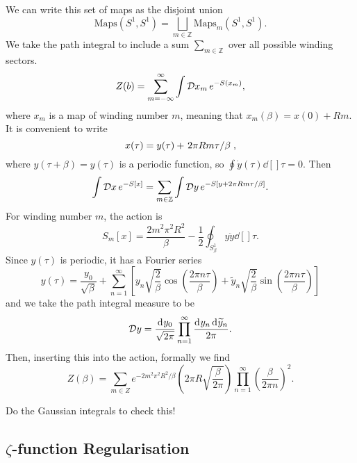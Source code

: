 We can write this set of maps as the disjoint union
\begin{equation}
  \text{Maps}(S^1, S^1) = \bigsqcup_{m \in \mathbb{Z}} \text{Maps}_m (S^1, S^1).
\end{equation}
We take the path integral to include a sum $\sum_{m \in \mathbb{Z}}$ over all possible winding sectors.
\begin{equation}
  Z(b) = \sum_{m = -\infty}^{\infty} \int \mathop{\mathcal{D} x_m} e^{-S(x_m)},
\end{equation}
where $x_m$ is a map of winding number $m$, meaning that $x_m(\beta) = x(0) + R m$. It is convenient to write
\begin{equation}
  x(\tau) = y(\tau) + \flatfrac{2 \pi R m \tau}{\beta},
\end{equation}
where $y(\tau + \beta) = y(\tau)$ is a  periodic function, so $\oint \dot{y}(\tau) \dd[]{\tau} = 0$.
Then
\begin{equation}
  \int \mathop{\mathcal{D} x} e^{-S[x]} = \sum_{m \in \mathbb{Z}} \int \mathop{\mathcal{D} y} e^{-S[y + 2 \pi R m \tau / \beta]}.
\end{equation}
For winding number $m$, the action is
\begin{equation}
  S_m[x] = \frac{2 m^2 \pi^2 R^2}{\beta} -\frac{1}{2} \oint_{S^1_\beta} y \ddot y \dd[]{\tau}.
\end{equation}
Since $y(\tau)$  is periodic, it has a Fourier series
\begin{equation}
  y(\tau) = \frac{y_0}{\sqrt{\beta}} + \sum_{n=1}^{\infty} \left[ y_n \sqrt{\frac{2}{\beta}} \cos(\frac{2\pi n \tau}{\beta}) + \widetilde{y}_n \sqrt{\frac{2}{\beta}} \sin(\frac{2\pi n \tau}{\beta}) \right]
\end{equation}
and we take the path integral measure to be
\begin{equation}
  \mathop{\mathcal{D} y} = \frac{\dd[]{y_0}}{\sqrt{2\pi}} \prod_{n=1}^\infty \frac{\dd[]{y_n} \dd[]{\widetilde{y}_n}}{2\pi}.
\end{equation}
Then, inserting this into the action, formally we find
\begin{equation}
  Z(\beta) = \sum_{m\in Z} e^{-2 m^2 \pi^2 R^2 / \beta} \left( 2 \pi R \sqrt{\frac{\beta}{2\pi}} \right) \prod_{n=1}^\infty \left( \frac{\beta}{2\pi n} \right)^2.
\end{equation}
\begin{exercise}
  Do the Gaussian integrals to check this!
\end{exercise}

\subsection{\texorpdfstring{$\zeta$}{Zeta}-function Regularisation}%
\label{sub:zeta_function_regularisation}


